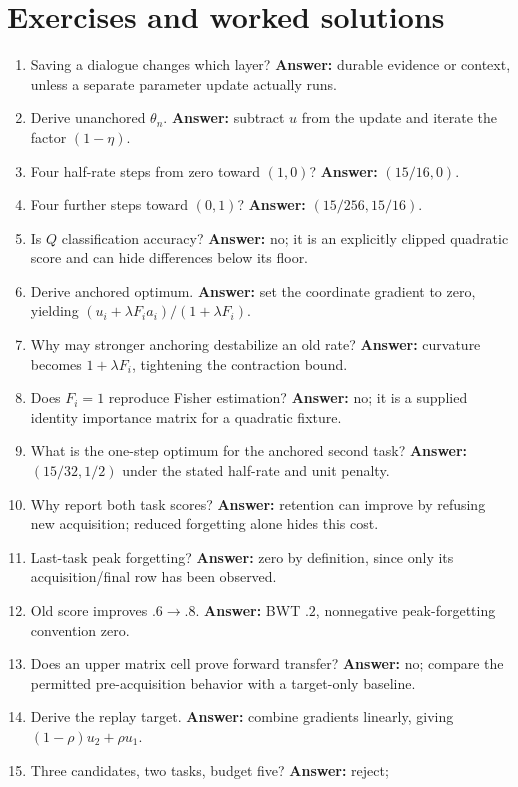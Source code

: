 \section{Exercises and worked solutions}
\begin{enumerate}
\item Saving a dialogue changes which layer? \textbf{Answer:} durable evidence
or context, unless a separate parameter update actually runs.
\item Derive unanchored $\theta_n$. \textbf{Answer:} subtract $u$ from the
update and iterate the factor $(1-\eta)$.
\item Four half-rate steps from zero toward $(1,0)$? \textbf{Answer:}
$(15/16,0)$.
\item Four further steps toward $(0,1)$? \textbf{Answer:} $(15/256,15/16)$.
\item Is $Q$ classification accuracy? \textbf{Answer:} no; it is an explicitly
clipped quadratic score and can hide differences below its floor.
\item Derive anchored optimum. \textbf{Answer:} set the coordinate gradient
to zero, yielding $(u_i+\lambda F_i a_i)/(1+\lambda F_i)$.
\item Why may stronger anchoring destabilize an old rate? \textbf{Answer:}
curvature becomes $1+\lambda F_i$, tightening the contraction bound.
\item Does $F_i=1$ reproduce Fisher estimation? \textbf{Answer:} no; it is
a supplied identity importance matrix for a quadratic fixture.
\item What is the one-step optimum for the anchored second task? \textbf{Answer:}
$(15/32,1/2)$ under the stated half-rate and unit penalty.
\item Why report both task scores? \textbf{Answer:} retention can improve by
refusing new acquisition; reduced forgetting alone hides this cost.
\item Last-task peak forgetting? \textbf{Answer:} zero by definition, since
only its acquisition/final row has been observed.
\item Old score improves $.6\to.8$. \textbf{Answer:} BWT $.2$, nonnegative
peak-forgetting convention zero.
\item Does an upper matrix cell prove forward transfer? \textbf{Answer:}
no; compare the permitted pre-acquisition behavior with a target-only baseline.
\item Derive the replay target. \textbf{Answer:} combine gradients linearly,
giving $(1-\rho)u_2+\rho u_1$.
\item Three candidates, two tasks, budget five? \textbf{Answer:} reject;

\end{enumerate}

